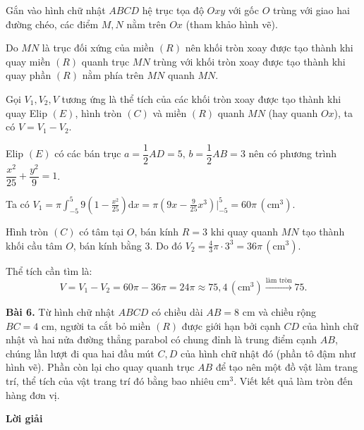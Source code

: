 \noindent Gắn vào hình chữ nhật $ABCD$ hệ trục tọa độ $Oxy$ với gốc $O$ trùng với giao hai đường chéo, các điểm $M, N$ nằm trên $Ox$ (tham khảo hình vẽ).

\noindent Do $MN$ là trục đối xứng của miền $(R)$ nên khối tròn xoay được tạo thành khi quay miền $(R)$ quanh trục $MN$ trùng với khối tròn xoay được tạo thành khi quay phần $(R)$ nằm phía trên $MN$ quanh $MN$.

\noindent Gọi $V_1, V_2, V$ tương ứng là thể tích của các khối tròn xoay được tạo thành khi quay Elip $(E)$, hình tròn $(C)$ và miền $(R)$ quanh $MN$ (hay quanh $Ox$), ta có $V = V_1 - V_2$.

\noindent Elip $(E)$ có các bán trục $a = \dfrac{1}{2}AD = 5,\, b = \dfrac{1}{2}AB = 3$ nên có phương trình $\dfrac{x^2}{25} + \dfrac{y^2}{9} = 1$.

\noindent Ta có $V_1 = \pi \int_{-5}^{5} 9\left(1 - \frac{x^2}{25}\right) \mathrm{d}x = \pi \left( 9x - \frac{9}{25}x^3 \right)\Bigg|_{-5}^{5} = 60\pi \, (\text{cm}^3)$.

\noindent Hình tròn $(C)$ có tâm tại $O$, bán kính $R = 3$ khi quay quanh $MN$ tạo thành khối cầu tâm $O$, bán kính bằng $3$. Do đó $V_2 = \frac{4}{3}\pi \cdot 3^3 = 36\pi \, (\text{cm}^3)$.

\noindent Thể tích cần tìm là:
\[
V = V_1 - V_2 = 60\pi - 36\pi = 24\pi \approx 75,4 \, (\text{cm}^3) \xrightarrow{\text{làm tròn}} 75.
\]


\noindent\textbf{Bài 6.} Từ hình chữ nhật $ABCD$ có chiều dài $AB = 8\text{ cm}$ và chiều rộng $BC = 4\text{ cm}$, người ta cắt bỏ miền $(R)$ được giới hạn bởi cạnh $CD$ của hình chữ nhật và hai nửa đường thẳng parabol có chung đỉnh là trung điểm cạnh $AB$, chúng lần lượt đi qua hai đầu mút $C, D$ của hình chữ nhật đó (phần tô đậm như hình vẽ). Phần còn lại cho quay quanh trục $AB$ để tạo nên một đồ vật làm trang trí, thể tích của vật trang trí đó bằng bao nhiêu $\text{cm}^3$. Viết kết quả làm tròn đến hàng đơn vị.

\begin{center}
\end{center}
\noindent\textbf{Lời giải}

